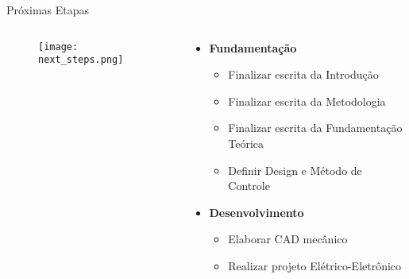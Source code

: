 \begin{frame}[t]{Próximas Etapas}
    \begin{columns}
        \begin{column}{0.25\textwidth}
            \begin{figure}
                \texttt{[image: next\_steps.png]}
            \end{figure}            
        \end{column}
        \begin{column}{0.75\textwidth}
            \begin{itemize}
                \item \textbf{Fundamentação}
                \begin{itemize}
                    \item Finalizar escrita da Introdução
                    \item Finalizar escrita da Metodologia
                    \item Finalizar escrita da Fundamentação Teórica
                    \item Definir Design e Método de Controle     
                \end{itemize}
                \item \textbf{Desenvolvimento}
                \begin{itemize}
                    \item Elaborar CAD mecânico
                    \item Realizar projeto Elétrico-Eletrônico
                \end{itemize}
            \end{itemize}            
        \end{column}
    \end{columns}

\end{frame}
